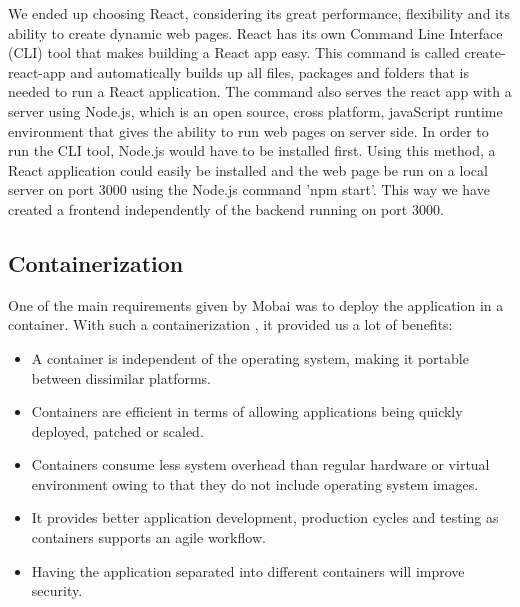 We ended up choosing React, considering its great performance, flexibility and its ability to create dynamic web pages. React has its own Command Line Interface (CLI) tool that makes building a React app easy. This command is called create-react-app and automatically builds up all files, packages and folders that is needed to run a React application. The command also serves the react app with a server using Node.js, which is an open source, cross platform, javaScript runtime environment that gives the ability to run web pages on server side. In order to run the CLI tool, Node.js would have to be installed first. Using this method, a React application could easily be installed and the web page be run on a local server on port 3000 using the Node.js command 'npm start'. This way we have created a frontend independently of the backend running on port 3000. 







\subsection*{Containerization}
One of the main requirements given by Mobai was to deploy the application in a container. With such a containerization \cite{Containerization}, it provided us a lot of benefits:
\begin{itemize}
    \item A container is independent of the operating system, making it portable between dissimilar platforms. 
    \item Containers are efficient in terms of allowing applications being quickly deployed, patched or scaled. 
    \item Containers consume less system overhead than regular hardware or virtual environment owing to that they do not include operating system images. 
    \item It provides better application development, production cycles and testing as containers supports an agile workflow.
    \item Having the application separated into different containers will improve security. 
\end{itemize}

